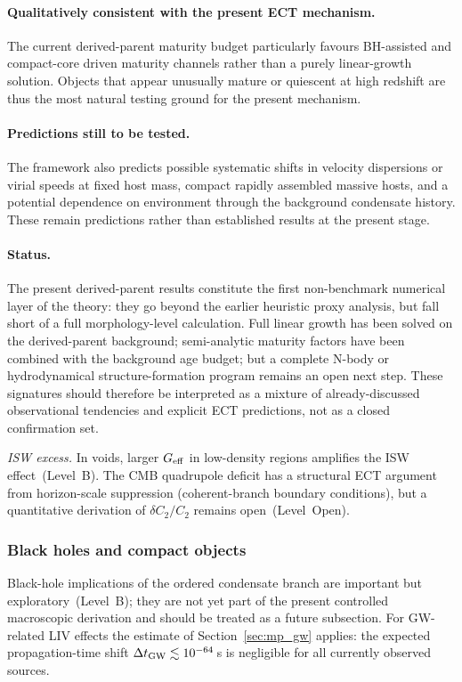 \documentclass[11pt,a4paper]{article}
\numberwithin{equation}{section}
\begin{document}
\paragraph{Qualitatively consistent with the present ECT mechanism.}
The current derived-parent maturity budget particularly favours
BH-assisted and compact-core driven maturity channels rather than a
purely linear-growth solution.
Objects that appear unusually mature or quiescent at high redshift are
thus the most natural testing ground for the present mechanism.

\paragraph{Predictions still to be tested.}
The framework also predicts possible systematic shifts in velocity
dispersions or virial speeds at fixed host mass, compact rapidly
assembled massive hosts, and a potential dependence on environment
through the background condensate history.
These remain predictions rather than established results at the
present stage.

\paragraph{Status.}
The present derived-parent results constitute the first non-benchmark
numerical layer of the theory: they go beyond the earlier heuristic
proxy analysis, but fall short of a full morphology-level calculation.
Full linear growth has been solved on the derived-parent background;
semi-analytic maturity factors have been combined with the background
age budget; but a complete N-body or hydrodynamical structure-formation
program remains an open next step.
These signatures should therefore be interpreted as a mixture of
already-discussed observational tendencies and explicit ECT predictions,
not as a closed confirmation set.

\textit{ISW excess.}
In voids, larger $G_{\rm eff}$ in low-density regions amplifies the
ISW effect~(Level~B).  The CMB quadrupole deficit has a structural
ECT argument from horizon-scale suppression (coherent-branch boundary
conditions), but a quantitative derivation of $\delta C_2/C_2$ remains
open~(Level~Open).

\subsubsection*{Black holes and compact objects}

Black-hole implications of the ordered condensate branch are
important but exploratory~(Level~B); they are not yet part of the
present controlled macroscopic derivation and should be treated as
a future subsection.
For GW-related LIV effects the estimate of Section~\ref{sec:mp_gw}
applies: the expected propagation-time shift
$\Delta t_{\rm GW}\lesssim 10^{-64}$\,s is negligible for all
currently observed sources.
\end{document}
